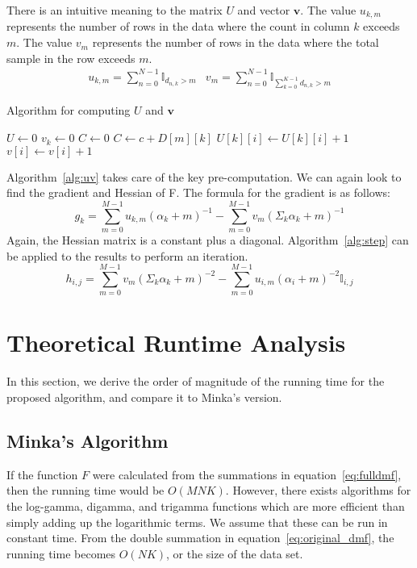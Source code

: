 \documentclass[twoside]{article}
\begin{document}
There is an intuitive meaning to the matrix $U$ and vector $\mathbf{v}$.  The value $u_{k,m}$ represents the number of rows in the data where the count in column $k$ exceeds $m$.  The value $v_m$ represents the number of rows in the data where the total sample in the row exceeds $m$.  
\[
\begin{array}{cc} u_{k,m}=\sum_{n=0}^{N-1}\mathbb{I}_{d_{n,k} > m} & v_m=\sum_{n=0}^{N-1}\mathbb{I}_{\sum_{k=0}^{K-1}d_{n,k} > m}
\end{array}
\]
\begin{algorithm}
  \caption{Algorithm for computing $U$ and $\mathbf{v}$}
  \begin{algorithmic}
  \State $U \leftarrow 0$
    \State $v_k \leftarrow 0$ \EndFor
    \State $C \leftarrow 0$
      \State $C \leftarrow c + D[m][k]$      
        \State $U[k][i] \leftarrow U[k][i] + 1$      
      \EndFor
    \EndFor
      \State $v[i] \leftarrow v[i] + 1$      
    \EndFor
  \EndFor
  \end{algorithmic}
  \label{alg:uv}
\end{algorithm}
Algorithm~\ref{alg:uv} takes care of the key pre-computation. We can again look to find the gradient and Hessian of F.  The formula for the gradient is as follows:
\begin{equation}
g_k= \sum_{m=0}^{M-1}u_{k,m}(\alpha_k+m)^{-1}-
\sum_{m=0}^{M-1}v_m(\Sigma_k\alpha_k+m)^{-1}
\end{equation}
Again, the Hessian matrix is a constant plus a diagonal.  Algorithm~\ref{alg:step} can be applied to the results to perform an iteration.
\begin{equation}
h_{i,j}=\sum_{m=0}^{M-1}v_m(\Sigma_k\alpha_k+m)^{-2}-
\sum_{m=0}^{M-1}u_{i,m}(\alpha_i+m)^{-2}\mathbb{I}_{i,j}
\end{equation}
\section{Theoretical Runtime Analysis}
In this section, we derive the order of magnitude of the running time for the proposed algorithm, and compare it to Minka's version.
\subsection{Minka's Algorithm}
If the function $F$ were calculated from the summations in equation~\eqref{eq:fulldmf}, then the running time would be $O(MNK)$.  However, there exists algorithms for the log-gamma, digamma, and trigamma functions which are more efficient than simply adding up the logarithmic terms\cite{wallach}. We assume that these can be run in constant time.  From the double summation in equation~\eqref{eq:original_dmf}, the running time becomes $O(NK)$, or the size of the data set.
\end{document}
